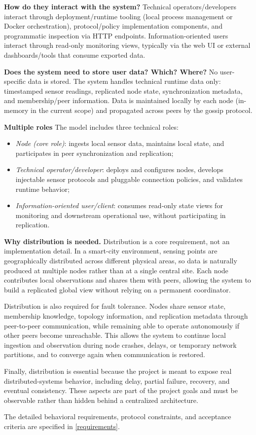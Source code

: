 \textbf{How do they interact with the system?}
Technical operators/developers interact through deployment/runtime tooling (local process management or Docker orchestration), protocol/policy implementation components, and programmatic inspection via HTTP endpoints. Information-oriented users interact through read-only monitoring views, typically via the web UI or external dashboards/tools that consume exported data.

\textbf{Does the system need to store user data? Which? Where?}
No user-specific data is stored. The system handles technical runtime data only: timestamped sensor readings, replicated node state, synchronization metadata, and membership/peer information. Data is maintained locally by each node (in-memory in the current scope) and propagated across peers by the gossip protocol.

\textbf{Multiple roles}
The model includes three technical roles:
\begin{itemize}
  \item \emph{Node (core role)}: ingests local sensor data, maintains local state, and participates in peer synchronization and replication;
  \item \emph{Technical operator/developer}: deploys and configures nodes, develops injectable sensor protocols and pluggable connection policies, and validates runtime behavior;
  \item \emph{Information-oriented user/client}: consumes read-only state views for monitoring and downstream operational use, without participating in replication.
\end{itemize}

\textbf{Why distribution is needed.}
Distribution is a core requirement, not an implementation detail. In a smart-city environment, sensing points are geographically distributed across different physical areas, so data is naturally produced at multiple nodes rather than at a single central site. Each node contributes local observations and shares them with peers, allowing the system to build a replicated global view without relying on a permanent coordinator.

Distribution is also required for fault tolerance. Nodes share sensor state, membership knowledge, topology information, and replication metadata through peer-to-peer communication, while remaining able to operate autonomously if other peers become unreachable. This allows the system to continue local ingestion and observation during node crashes, delays, or temporary network partitions, and to converge again when communication is restored.

Finally, distribution is essential because the project is meant to expose real distributed-systems behavior, including delay, partial failure, recovery, and eventual consistency. These aspects are part of the project goals and must be observable rather than hidden behind a centralized architecture.

The detailed behavioral requirements, protocol constraints, and acceptance criteria are specified in \cref{requirements}.

\clearpage

